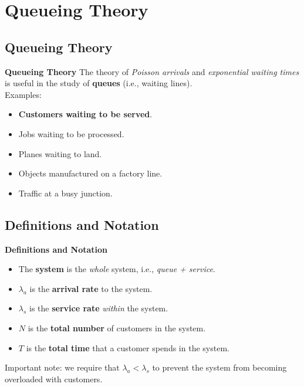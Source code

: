\documentclass[compress]{beamer}        %
\makeatletter
\newcommand{\tcb}{\textcolor{beamer@blendedblue}}
\makeatother
\begin{document}
\section{Queueing Theory\hspace{0.2cm}}
\subsection{Queueing Theory}
\begin{frame}{\bf \tcb{Queueing Theory}}
The theory of \emph{Poisson arrivals} and \emph{exponential waiting times} is useful in the study of {\bf queues} (i.e., waiting lines).\\[0.4cm]

Examples:\\
\begin{itemize}\itemsep0.2cm
\item {\bf Customers waiting to be served}.
\item Jobs waiting to be processed.
\item Planes waiting to land.
\item Objects manufactured on a factory line.
\item Traffic at a busy junction.\\
\end{itemize}

\end{frame}


\subsection{Definitions and Notation}
\begin{frame}{\bf \tcb{Definitions and Notation}}

\begin{itemize}\itemsep0.5cm
\item The {\bf system} is the \emph{whole} system, i.e., \emph{queue + service}.
\item  $\lambda_a$ is the {\bf arrival rate} to the system.
\item  $\lambda_s$ is the {\bf service rate} \emph{within} the system.
\item  $N$ is the {\bf total number} of customers in the system.
\item  $T$ is the  {\bf total time} that a customer spends in the system.\\[0.8cm]
\end{itemize}


Important note: we require that $\boxed{\lambda_a < \lambda_s}$  to prevent the system from becoming overloaded with customers.
\end{frame}
\end{document}
